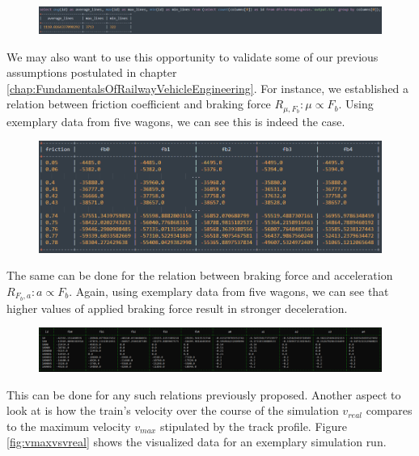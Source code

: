 \begin{figure}[htb!]
	\centering
	\includegraphics[width=\linewidth]{./pic/query_avg_lines}
\end{figure}

We may also want to use this opportunity to validate some of our previous assumptions postulated in chapter \ref{chap:FundamentalsOfRailwayVehicleEngineering}. For instance, we established a relation between friction coefficient and braking force $R_{\mu,F_{b}}:\mu \propto F_{b}$. Using exemplary data from five wagons, we can see this is indeed the case.

\begin{figure}[htb!]
	\centering
	\includegraphics[width=\linewidth]{./pic/query_fc_fb}
\end{figure}

The same can be done for the relation between braking force and acceleration $R_{F_{b},a}:a \propto F_{b}$. Again, using exemplary data from five wagons, we can see that higher values of applied braking force result in stronger deceleration.

\begin{figure}[htb!]
	\centering
	\includegraphics[width=\linewidth]{./pic/query_fb_a}
\end{figure}

This can be done for any such relations previously proposed. Another aspect to look at is how the train's velocity over the course of the simulation $v_{real}$ compares to the maximum velocity $v_{max}$ stipulated by the track profile. Figure \ref{fig:vmaxvsvreal} shows the visualized data for an exemplary simulation run. 

